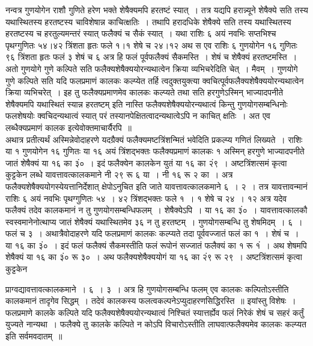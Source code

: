 \documentclass[11pt, openany]{book}
\begin{document}
 \vspace{-3mm}
 नन्वत्र गुणयोगेन राशौ गुणिते हरेण भक्ते शेषैक्यमपि हरतष्टं 
स्यात्~। तत्र यद्यपि हरान्न्यूने शेषैक्ये सति तस्य यथास्थितस्य हरतष्टस्य 
चाविशेषान्न काचित्क्षतिः~। तथापि हरादधिके शेषैक्ये सति तस्य 
यथास्थितस्य हरतष्टस्य च हरतुल्यमन्तरं स्यात् फलैक्यं च सैकं स्यात्~। 
यथा राशिः ६ अयं नवभिः सप्तभिश्च पृथग्गुणितः ५४।४२ त्रिंशता 
हृतः फले १।१ शेषे च २४।१२ अथ स एव राशिः ६ गुणयोगेन 
१६ गुणितः ९६ त्रिंशता हृतः फलं ३ शेषं च ६ अत्र हि फलं
\newpage
\noindent पूर्वफलैक्यं सैकमस्ति~। शेषं च शेषैक्यं हरतष्टमस्ति~। अतो गुणयोगे 
गुणे कल्पिते सति फलैक्यशेषैक्ययोरन्यथात्वेन क्रिया व्यभिचरेदिति चेत्~। 
मैवम्~। गुणयोगे गुणे कल्पिते सति यदि फलप्रमाणं कालकः 
कल्प्येत तर्हि त्वदुक्तयुक्त्या क्वचित्पूर्वफलैक्यशेषैक्ययोरन्यथात्वेन क्रिया 
व्यभिचरेत्~। इह तु फलैक्यप्रमाणमेव कालकः कल्प्यते तथा सति हरगुणेऽस्मिन् भाज्यादपनीते शेषैक्यमपि यथास्थितं स्यान्न हरतष्टम् इति नास्ति 
फलैक्यशेषैक्ययोरन्यथात्वं किन्तु गुणयोगसम्बन्धिनोः फलशेषयोः क्वचिदन्यथात्वं 
स्यात् परं तस्यानपेक्षितत्वादन्यथात्वेऽपि न काचित् क्षतिः~। अत एव 
लब्धैक्यप्रमाणं कालक इत्येवोक्तमाचार्यैरपि~॥ \\

\vspace{-3mm}
 अथात्र प्रतीत्यर्थं अस्मिन्नेवोदाहरणे यदग्रैक्यं फलैक्यमष्टत्रिंशन्मितं
भवेदिति प्रकल्प्य गणितं लिख्यते~। राशिः या १ गुणयोगेन १६ गुणितः 
या १६ अयं त्रिंशद्भक्तः फलैक्यप्रमाणं कालकः १ अस्मिन् हरगुणे 
भाज्यादपनीते जातं शेषैक्यं या १६ का ३ं०~। इदं फलैक्येन 
कालकेन युतं या १६ का २ं९~। अष्टत्रिंशत्समं कृत्वा कुट्टकेन 
लब्धे यावत्तावत्कालकमाने नी २९ रू ६ या~। नी १६ रू २ 
का~। अत्र फलैक्यशेषैक्ययोगस्येयत्तानिर्देशात् क्षेपोऽनुचित इति जाते 
यावत्तावत्कालकमाने ६~। २~। तत्र यावत्तावन्मानं राशिः ६ अयं नवभिः 
पृथग्गुणितः ५४~। ४२ त्रिंशद्भक्तः फले १~। १ शेषे च २४~। १२ अत्र 
यदेव फलैक्यं तदेव कालकमानं न तु गुणयोगसम्बन्धिफलम्~। 
शेषैक्येऽपि~। या १६ का ३ं०~। यावत्तावत्कालकौ स्वस्वमानेनोत्थाप्य जातं 
शेषैक्यं यथास्थितमेव ३६ न तु हरतष्टम्~। गुणयोगसम्बन्धि तु शेषमिदम्~। 
६~। फलं च ३~। अथात्रैवोदाहरणे यदि फलप्रमाणं कालकः कल्प्यते 
तदा पूर्ववज्जातं फलं का १~। शेषं च~। या १६ का ३ं०~। इदं फलं 
फलैक्यं सैकमस्तीति फलं रूपोनं सज्जातं फलैक्यं का १ रू १ं~। 
अथ शेषमपि शेषैक्यं या १६ का ३ं० रू ३०~। अथ फलैक्यशेषैक्ययोगं या १६ का २ं९ रू २९~। अष्टत्रिंशत्समं कृत्वा कुट्टकेन
 \newpage%

\noindent प्राग्वद्यावत्तावत्कालकमाने~। ६~। ३~। अत्र हि गुणयोगसम्बन्धि फलम् एव कालकः कल्पितोऽस्तीति कालकमानं तादृगेव सिद्धम्~। तदेवं कालकस्य 
फलत्वकल्पनेऽप्युदाहरणसिद्धिरस्ति~॥ इयांस्तु विशेषः~। फलप्रमाणे कालके 
कल्पिते यदि फलैक्यशेषैक्ययोरन्यथात्वं निश्चितं स्यात्तर्ह्येव फलं निरेकं शेषं 
च सहरं कर्तुं युज्यते नान्यथा~। फलैक्ये तु कालके कल्पिते न 
कोऽपि विचारोऽस्तीति लाघवात्फलैक्यमेव कालकः कल्प्यत इति 
सर्वमवदातम्~॥ \\
\end{document}
